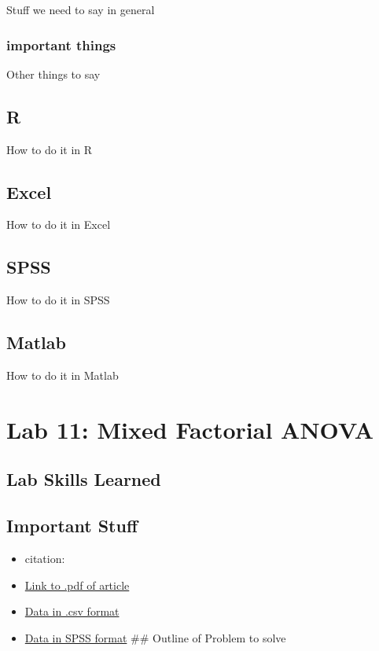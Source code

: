 \documentclass[]{book}
\providecommand{\tightlist}{%
  \setlength{\itemsep}{0pt}\setlength{\parskip}{0pt}}
\theoremstyle{definition}
\theoremstyle{definition}
\theoremstyle{definition}
\theoremstyle{remark}
\begin{document}
Stuff we need to say in general

\subsection{important things}\label{important-things-5}

Other things to say

\section{R}\label{r-10}

How to do it in R

\section{Excel}\label{excel-9}

How to do it in Excel

\section{SPSS}\label{spss-9}

How to do it in SPSS

\section{Matlab}\label{matlab-9}

How to do it in Matlab

\chapter{Lab 11: Mixed Factorial
ANOVA}\label{lab-11-mixed-factorial-anova}

\section{Lab Skills Learned}\label{lab-skills-learned-5}

\section{Important Stuff}\label{important-stuff-5}

\begin{itemize}
\tightlist
\item
  citation:
\item
  \href{}{Link to .pdf of article}
\item
  \href{}{Data in .csv format}
\item
  \href{}{Data in SPSS format} \#\# Outline of Problem to solve
\end{itemize}
\end{document}
